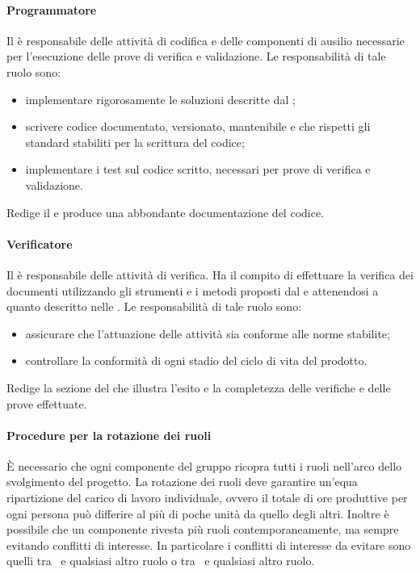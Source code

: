 \documentclass[12pt,a4paper]{article}
\begin{document}
\paragraph{Programmatore}
Il \PR{} è responsabile delle attività di codifica e delle componenti di ausilio necessarie per l'esecuzione delle prove di verifica e validazione. Le responsabilità di tale ruolo sono:
\begin{itemize}
	\item implementare rigorosamente le soluzioni descritte dal \PG{};
	\item scrivere codice documentato, versionato, mantenibile e che rispetti gli standard stabiliti per la scrittura del codice;
	\item implementare i test sul codice scritto, necessari per prove di verifica e validazione.
\end{itemize}
Redige il \MU{} e produce una abbondante documentazione del codice.

\paragraph{Verificatore}
Il \VR{} è responsabile delle attività di verifica. Ha il compito di effettuare la verifica dei documenti utilizzando gli strumenti e i metodi proposti dal \PdQ{} e attenendosi a quanto descritto nelle \NdP{}. 
Le responsabilità di tale ruolo sono:
\begin{itemize}
	\item assicurare che l'attuazione delle attività sia conforme alle norme stabilite;
	\item controllare la conformità di ogni stadio del ciclo di vita del prodotto.
\end{itemize}
Redige la sezione del \PdQ{} che illustra l'esito e la completezza delle verifiche
e delle prove effettuate.

\paragraph{Procedure per la rotazione dei ruoli}
È necessario che ogni componente del gruppo ricopra tutti i ruoli nell'arco dello svolgimento del progetto. La rotazione dei ruoli deve garantire un'equa ripartizione del carico di lavoro individuale, ovvero il totale di ore produttive per ogni persona può differire al più di poche unità da quello degli altri. Inoltre è possibile che un componente rivesta più ruoli contemporaneamente, ma sempre evitando conflitti di interesse. In particolare i conflitti di interesse da evitare sono quelli tra \PM\ e qualsiasi altro ruolo o tra \VR\ e qualsiasi altro ruolo.
\end{document}
